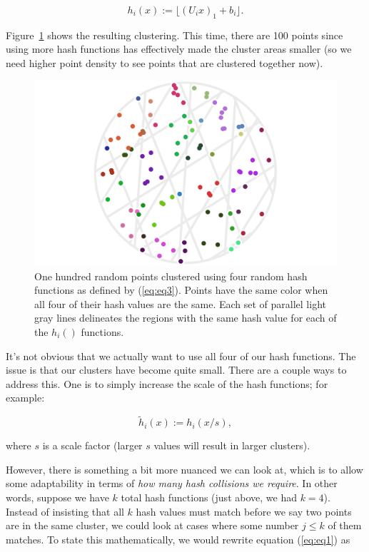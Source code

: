 \documentclass[20pt,]{extarticle}
\begin{document}
\begin{equation} h_i(x) := \lfloor (U_i x)_1 + b_i \rfloor. \label{eq:eq3}\end{equation}

Figure~\ref{fig:fig4} shows the resulting clustering. This time, there
are 100 points since using more hash functions has effectively made the
cluster areas smaller (so we need higher point density to see points
that are clustered together now).

\begin{figure}
\centering
\includegraphics{images/lsh_image4.png}
\caption{One hundred random points clustered using four random hash
functions as defined by (\ref{eq:eq3}). Points have the same color when
all four of their hash values are the same. Each set of parallel light
gray lines delineates the regions with the same hash value for each of
the \(h_i()\) functions.}\label{fig:fig4}
\end{figure}

It's not obvious that we actually want to use all four of our hash
functions. The issue is that our clusters have become quite small. There
are a couple ways to address this. One is to simply increase the scale
of the hash functions; for example:

\[ \tilde h_i(x) := h_i(x/s), \]

where \(s\) is a scale factor (larger \(s\) values will result in larger
clusters).

However, there is something a bit more nuanced we can look at, which is
to allow some adaptability in terms of \emph{how many hash collisions we
require}. In other words, suppose we have \(k\) total hash functions
(just above, we had \(k=4\)). Instead of insisting that all \(k\) hash
values must match before we say two points are in the same cluster, we
could look at cases where some number \(j \le k\) of them matches. To
state this mathematically, we would rewrite equation (\ref{eq:eq1}) as
\end{document}

